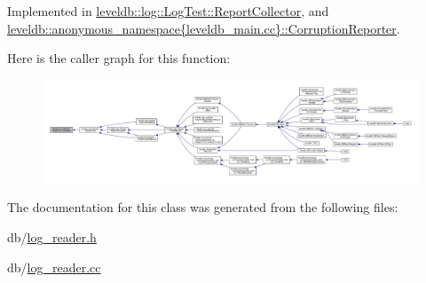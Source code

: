 Implemented in \hyperlink{classleveldb_1_1log_1_1_log_test_1_1_report_collector_ae78a594770acf40e6e6cc32ccab7498a}{leveldb\+::log\+::\+Log\+Test\+::\+Report\+Collector}, and \hyperlink{classleveldb_1_1anonymous__namespace_02leveldb__main_8cc_03_1_1_corruption_reporter_a802aca751cc0d66ae8e44fcbeb3f46cb}{leveldb\+::anonymous\+\_\+namespace\{leveldb\+\_\+main.\+cc\}\+::\+Corruption\+Reporter}.



Here is the caller graph for this function\+:
\nopagebreak
\begin{figure}[H]
\begin{center}
\leavevmode
\includegraphics[width=350pt]{classleveldb_1_1log_1_1_reader_1_1_reporter_a2d28d30f9559d5fc9f94af41d239932e_icgraph}
\end{center}
\end{figure}




The documentation for this class was generated from the following files\+:\begin{DoxyCompactItemize}
\item 
db/\hyperlink{log__reader_8h}{log\+\_\+reader.\+h}\item 
db/\hyperlink{log__reader_8cc}{log\+\_\+reader.\+cc}\end{DoxyCompactItemize}
